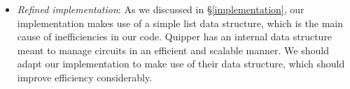 \begin{itemize}
  \item \textit{Refined implementation}: As we discussed in \S\ref{implementation}, our implementation makes use of a simple list data structure, which is the main cause of inefficiencies in our code. Quipper has an internal data structure meant to manage circuits in an efficient and scalable manner. We should adapt our implementation to make use of their data structure, which should improve efficiency considerably.

\end{itemize}
